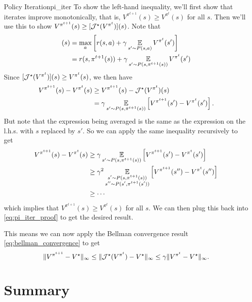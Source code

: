 \documentclass[../main/main]{subfiles}
\begin{document}
\begin{theorem}{Policy Iteration}{pi_iter}
To show the left-hand inequality, we'll first show that iterates improve monotonically, that is, $V^{\pi^{t+1}}(s) \ge V^{\pi^{t}}(s)$ for all $s$. Then we'll use this to show $V^{\pi^{t+1}}(s) \ge [\mathcal{J}^{\star}(V^{\pi^{t}})](s)$. Note that
\begin{align*}
    [\bop^{\star} (V^{\pi^{t}})](s) &= \max_a \left[ r(s, a) + \gamma \E_{s' \sim P(s, a)} V^{\pi^{t}}(s') \right] \\
    &= r(s, \pi^{t+1}(s)) + \gamma \E_{s' \sim P(s, \pi^{t+1}(s))} V^{\pi^{t}}(s')
\end{align*}
Since $[\mathcal{J}^{\star}(V^{\pi^{t}})](s) \ge V^{\pi^{t}}(s)$, we then have
\begin{equation}
    \begin{aligned}
        V^{\pi^{t+1}}(s) - V^{\pi^{t}}(s) &\ge V^{\pi^{t+1}}(s) - \mathcal{J}^{\star} (V^{\pi^{t}})(s) \nonumber \\
        &= \gamma \operatorname*{\mathbb{E}}_{s' \sim P(s, \pi^{t+1}(s))} \left[V^{\pi^{t+1}}(s') -  V^{\pi^{t}}(s') \right].
    \end{aligned} \label{eq:pi_iter_proof}
\end{equation}
But note that the expression being averaged is the same as the expression on the l.h.s. with $s$ replaced by $s'$. So we can apply the same inequality recursively to get
\begin{align*}
    V^{\pi^{t+1}}(s) - V^{\pi^{t}}(s) &\ge  \gamma \operatorname*{\mathbb{E}}_{s' \sim P(s, \pi^{t+1}(s))} \left[V^{\pi^{t+1}}(s') -  V^{\pi^{t}}(s') \right] \\
    &\ge \gamma^2 \operatorname*{\mathbb{E}}_{\substack{s' \sim P(s, \pi^{t+1}(s)) \\ s'' \sim P(s', \pi^{t+1}(s'))}} \left[V^{\pi^{t+1}}(s'') -  V^{\pi^{t}}(s'') \right]\\
    &\ge \cdots
\end{align*}
which implies that $V^{\pi^{t+1}}(s) \ge V^{\pi^{t}}(s)$ for all $s$. We can then plug this back into \ref{eq:pi_iter_proof} to get the desired result.

This means we can now apply the Bellman convergence result \ref{eq:bellman_convergence} to get
\[
    \|V^{\pi^{t+1}} - V^\star \|_{\infty} \le \|\mathcal{J}^{\star} (V^{\pi^{t}}) - V^{\star}\|_{\infty} \le \gamma \|V^{\pi^{t}} - V^\star \|_{\infty}.
\]
\end{theorem}

\section{Summary}
\end{document}

